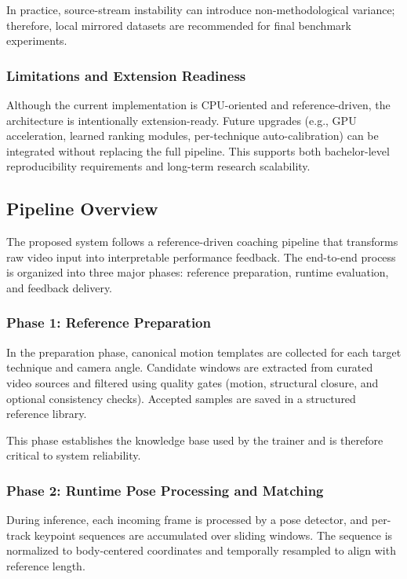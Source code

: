 \documentclass[12pt]{article}
\begin{document}
{In practice, source-stream instability can introduce non-methodological variance; therefore, local mirrored datasets are recommended for final benchmark experiments.

\subsubsection{Limitations and Extension Readiness}

Although the current implementation is CPU-oriented and reference-driven, the architecture is intentionally extension-ready. Future upgrades (e.g., GPU acceleration, learned ranking modules, per-technique auto-calibration) can be integrated without replacing the full pipeline. This supports both bachelor-level reproducibility requirements and long-term research scalability.

\subsection{Pipeline Overview}

The proposed system follows a reference-driven coaching pipeline that transforms raw video input into interpretable performance feedback. The end-to-end process is organized into three major phases: reference preparation, runtime evaluation, and feedback delivery.

\subsubsection{Phase 1: Reference Preparation}

In the preparation phase, canonical motion templates are collected for each target technique and camera angle. Candidate windows are extracted from curated video sources and filtered using quality gates (motion, structural closure, and optional consistency checks). Accepted samples are saved in a structured reference library.

This phase establishes the knowledge base used by the trainer and is therefore critical to system reliability.

\subsubsection{Phase 2: Runtime Pose Processing and Matching}

During inference, each incoming frame is processed by a pose detector, and per-track keypoint sequences are accumulated over sliding windows. The sequence is normalized to body-centered coordinates and temporally resampled to align with reference length.

}
\end{document}
